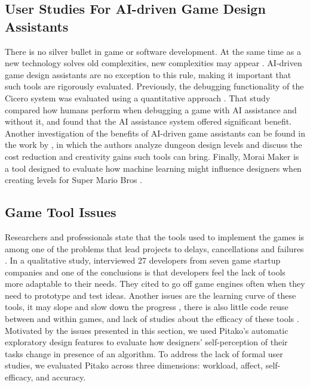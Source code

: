 \documentclass[letterpaper]{article} %
\begin{document}
\subsection{User Studies For AI-driven Game Design Assistants}
There is no silver bullet in game or software development. At the same time as a new technology solves old complexities, new complexities may appear \cite{4420077}. AI-driven game design assistants are no exception to this rule, making it important that such tools are rigorously evaluated. Previously, the debugging functionality of the Cicero system was evaluated using a quantitative approach \cite{Machado2018AIAssistedGD}. That study compared how humans perform when debugging a game with AI assistance and without it, and found that the AI assistance system offered significant benefit. Another investigation of the benefits of AI-driven game assistants can be found in the work by  \cite{alvarez2018fostering}, in which the authors analyze dungeon design levels and discuss the cost reduction and creativity gains such tools can bring. Finally, Morai Maker is a tool designed to evaluate how machine learning might influence designers when creating levels for Super Mario Bros \cite{guzdial2019friend}.

\subsection{Game Tool Issues}
Researchers and professionals state that the tools used to implement the games is among one of the problems that lead  projects to delays, cancellations and failures \cite{petrillo2009went,washburn2016went}.
In a qualitative study,  \cite{Kasurinen:2013:GDE:2460999.2461004} interviewed 27 developers from seven game startup companies and one of the conclusions is that developers feel the lack of tools more adaptable to their needs. They cited to go off game engines often when they need to prototype and test ideas. Another issues are the learning curve of these tools, it may slope and slow down the progress \cite{Kasurinen:2013:GDE:2460999.2461004}, there is also little code reuse between and within games, and lack of studies about the efficacy of these tools \cite{murphy2014cowboys}.
Motivated by the issues presented in this section, we used Pitako's automatic exploratory design features to evaluate how designers' self-perception of their tasks change in presence of an algorithm. To address the lack of formal user studies, we evaluated Pitako across three dimensions: workload, affect, self-efficacy, and accuracy.
\end{document}
